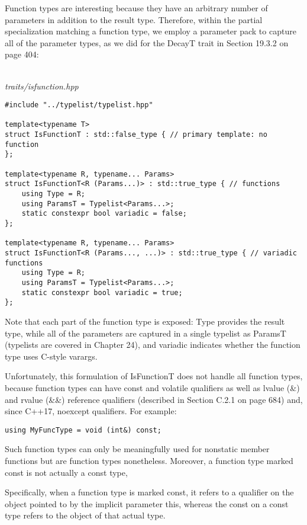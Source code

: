 
Function types are interesting because they have an arbitrary number of parameters in addition to the result type. Therefore, within the partial specialization matching a function type, we employ a parameter pack to capture all of the parameter types, as we did for the DecayT trait in Section 19.3.2 on page 404:

\hspace*{\fill} \\ %
\noindent
\textit{traits/isfunction.hpp}
\begin{lstlisting}[style=styleCXX]
#include "../typelist/typelist.hpp"

template<typename T>
struct IsFunctionT : std::false_type { // primary template: no function
};

template<typename R, typename... Params>
struct IsFunctionT<R (Params...)> : std::true_type { // functions
	using Type = R;
	using ParamsT = Typelist<Params...>;
	static constexpr bool variadic = false;
};

template<typename R, typename... Params>
struct IsFunctionT<R (Params..., ...)> : std::true_type { // variadic functions
	using Type = R;
	using ParamsT = Typelist<Params...>;
	static constexpr bool variadic = true;
};
\end{lstlisting}

Note that each part of the function type is exposed: Type provides the result type, while all of the parameters are captured in a single typelist as ParamsT (typelists are covered in Chapter 24), and variadic indicates whether the function type uses C-style varargs.

Unfortunately, this formulation of IsFunctionT does not handle all function types, because function types can have const and volatile qualifiers as well as lvalue (\&) and rvalue (\&\&) reference qualifiers (described in Section C.2.1 on page 684) and, since C++17, noexcept qualifiers. For example:

\begin{lstlisting}[style=styleCXX]
using MyFuncType = void (int&) const;
\end{lstlisting}

Such function types can only be meaningfully used for nonstatic member functions but are function types nonetheless. Moreover, a function type marked const is not actually a const type,

\begin{tcolorbox}[colback=webgreen!5!white,colframe=webgreen!75!black]
\hspace*{0.75cm}Specifically, when a function type is marked const, it refers to a qualifier on the object pointed to by the implicit parameter this, whereas the const on a const type refers to the object of that actual type.
\end{tcolorbox}

